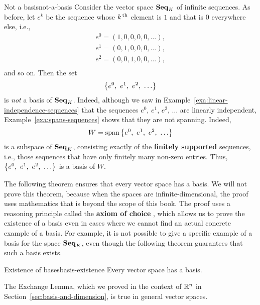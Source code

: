 \begin{example}{Not a basis}{not-a-basis}
  Consider the vector space $\mathbf{Seq}_K$ of infinite sequences. As before,
  let $e^k$ be the sequence whose $k^{\,\rm th}$ element is $1$ and that is
  $0$ everywhere else, i.e.,
    \begin{equation*}
    \begin{array}{l}
      e^0 = (1,0,0,0,0,\ldots), \\
      e^1 = (0,1,0,0,0,\ldots), \\
      e^2 = (0,0,1,0,0,\ldots), \\
    \end{array}
  \end{equation*}
  and so on. Then the set
  \begin{equation*}
    \left\{e^0,~ e^1,~ e^2,~ \ldots\right\}
  \end{equation*}
  is \textit{not} a basis of $\mathbf{Seq}_K$. Indeed, although we saw in
  Example~\ref{exa:linear-independence-sequences} that the sequences
  $e^0$, $e^1$, $e^2$, $\ldots$ are linearly independent,
  Example~\ref{exa:spans-sequences} shows that they are not spanning.
  Indeed,
  \begin{equation*}
    W = \sspan\set{e^0,~ e^1,~ e^2,~ \ldots}
  \end{equation*}
  is a subspace of $\mathbf{Seq}_K$, consisting exactly of the
  \textbf{finitely supported}%
   sequences, i.e., those sequences
  that have only finitely many non-zero entries. Thus, $\left\{e^0,~ e^1,~
    e^2,~ \ldots\right\}$ is a basis of $W$.
\end{example}

The following theorem ensures that every vector space has a basis.  We
will not prove this theorem, because when the spaces are
infinite-dimensional, the proof uses mathematics that is beyond the
scope of this book. The proof uses a reasoning principle called the
\textbf{axiom of choice}%
, which allows us to prove the existence of a
basis even in cases where we cannot find an actual concrete example of
a basis.  For example, it is not possible to give a specific example
of a basis for the space $\mathbf{Seq}_K$, even though the following theorem
guarantees that such a basis exists.

\begin{theorem}{Existence of bases}{basis-existence}
  Every vector space has a basis.
\end{theorem}

The Exchange Lemma, which we proved in the context of $\mathbb{R}^n$ in
Section~\ref{sec:basis-and-dimension}, is true in general vector
spaces.

